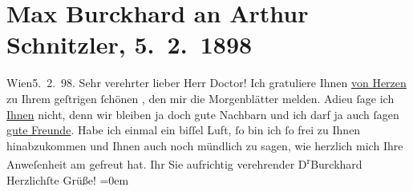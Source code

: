 

         \renewcommand{\erwaehnteOrte}{Orte: Burgtheater, Carl-Theater, Wien}
         \renewcommand{\erwaehnteWerke}{Werke: Freiwild. Schauspiel in 3 Akten}
               \section[Max Burckhard an Arthur Schnitzler, 5. 2. 1898]{ Max Burckhard an Arthur Schnitzler, 5. 2. 1898}\nopagebreak{}\rehead{ }\begin{ledgroupsized}[t]{13cm}\normalsize\beginnumbering \toendnotes[C]{\smallbreak\pagebreak[2]} 
\toendnotes[C]{\smallbreak}\pstart
           \raggedleft{}{\pb}Wien5. 2. 98.\pend
           \pstart{}Sehr verehrter lieber Herr Doctor!\pend\pstart
           Ich gratuliere Ihnen \uline{von Herzen} zu Ihrem geſtrigen
               ſchönen \label{K_L00773-1v}\label{K_L00773-1h}, den mir die
               Morgenblätter melden. Adieu ſage ich \uline{Ihnen} nicht,
               denn wir bleiben ja doch gute Nachbarn und ich darf ja auch ſagen \uline{gute Freunde}. Habe ich einmal ein biſſel Luft, ſo bin
               ich ſo frei zu Ihnen hinabzukommen und Ihnen auch noch mündlich zu sagen, wie
               herzlich mich Ihre Anweſenheit am \label{K_L00773-2v}\label{K_L00773-2h} gefreut hat. Ihr Sie aufrichtig verehrender\pend
           \pstart
           \spacefill\mbox{D\textsuperscript{r}Burckhard}{\\[\baselineskip]}Herzlichſte Grüße!\pend
           \leftskip=0em{}
         
         \endnumbering{}\end{ledgroupsized}  \newcommand{\dateiname}{L00773}\newcommand{\titel}{Max Burckhard an Arthur Schnitzler, 5. 2. 1898}\newcommand{\editorInnen}{Martin Anton Müller und Gerd-Hermann Susen}
      